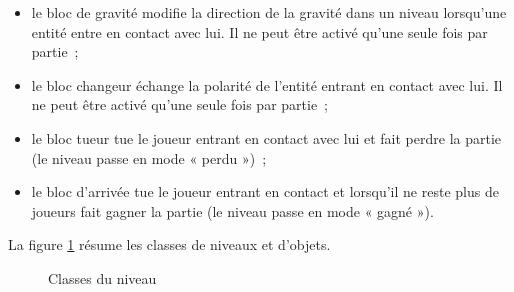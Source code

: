 \begin{itemize}
    \item le bloc de gravité modifie la direction de la gravité
    dans un niveau lorsqu'une entité entre en contact avec lui.
    Il ne peut être activé qu'une seule fois par partie~;

    \item le bloc changeur échange la polarité de l'entité
    entrant en contact avec lui. Il ne peut être activé qu'une seule
    fois par partie~;

    \item le bloc tueur tue le joueur entrant en contact avec lui
    et fait perdre la partie (le niveau passe en mode « perdu »)~;

    \item le bloc d'arrivée tue le joueur entrant en contact et lorsqu'il
    ne reste plus de joueurs fait gagner la partie (le niveau passe
    en mode « gagné »).
\end{itemize}

La figure \ref{fig:analyse-uml-level} résume les classes de niveaux
et d'objets.

\begin{figure}[p!]
    \centering
    
    \caption{Classes du niveau}
    \label{fig:analyse-uml-level}
\end{figure}
\restoregeometry
